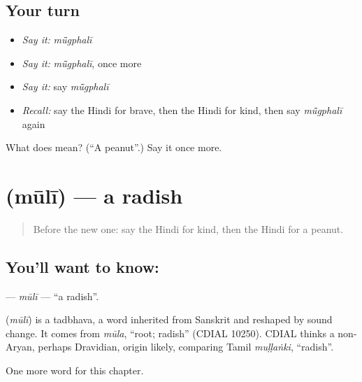 \subsection*{Your turn}
\begin{itemize}
\raggedright
  \item \emph{Say it:} \emph{mū̃gphalī}
  \item \emph{Say it:} \emph{mū̃gphalī}, once more
  \item \emph{Say it:} say \emph{mū̃gphalī}
  \item \emph{Recall:} say the Hindi for brave, then the Hindi for kind, then say \emph{mū̃gphalī} again
\end{itemize}

\begin{tcolorbox}[breakable,colback=teal!4,colframe=teal!35!black,title={Before you move on}]
What does  mean? (\textquotedblleft{}A peanut\textquotedblright{}.) Say it once more.
\end{tcolorbox}
\section[\texorpdfstring{\hi{मूली} (mūlī)}{मूली (mūlī)}]{ (mūlī) — a radish}

\label{lesson:HI-C216-muli}



\begin{quote}
Before the new one: say the Hindi for kind, then the Hindi for a peanut.
\end{quote}

\subsection*{You'll want to know: }
\textbf{} — \emph{mūlī} — \textquotedblleft{}a radish\textquotedblright{}.

\begin{cousinweb}
\textbf{} (\emph{mūlī}) is a tadbhava, a word inherited from Sanskrit and reshaped by sound change. It comes from \emph{mūla}, \textquotedblleft{}root; radish\textquotedblright{} (CDIAL 10250). CDIAL thinks a non-Aryan, perhaps Dravidian, origin likely, comparing Tamil \emph{muḷḷaṅki}, \textquotedblleft{}radish\textquotedblright{}.
\end{cousinweb}

\begin{grammarlens}[title={What you've built}]
One more word for this chapter.
\end{grammarlens}


